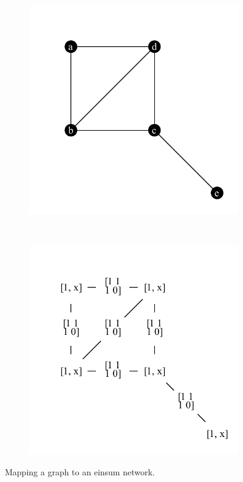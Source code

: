 \documentclass{article}
\newcommand{\<}{\langle}
\renewcommand{\>}{\rangle}
\theoremstyle{definition}\newtheorem{definition}{\textit{Definition}}
\begin{document}
\begin{figure}[t!]
    \centering
    \begin{subfigure}[t]{0.4\textwidth}
        \centering
        \centerline{\includegraphics[width=0.8\columnwidth,trim={0 0cm 0 0},clip]{../notebooks/fig1.pdf}}
        \caption{}
    \end{subfigure}%
    ~
    \begin{subfigure}[t]{0.4\textwidth}
        \centering
    \centerline{\includegraphics[width=0.8\columnwidth,trim={0 0cm 0 0},clip]{../notebooks/fig2.pdf}}
        \caption{}
    \end{subfigure}
    \caption{Mapping a graph to an einsum network.}\label{fig:einsummapping}
\end{figure}
\end{document}
